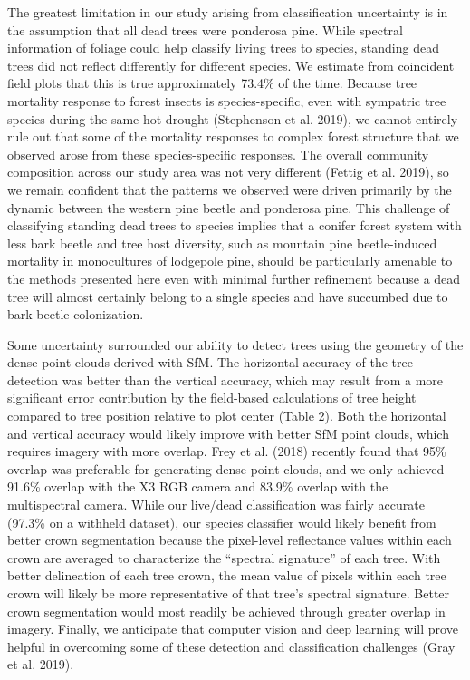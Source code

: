 \documentclass[]{article}
\begin{document}
The greatest limitation in our study arising from classification
uncertainty is in the assumption that all dead trees were ponderosa
pine. While spectral information of foliage could help classify living
trees to species, standing dead trees did not reflect differently for
different species. We estimate from coincident field plots that this is
true approximately 73.4\% of the time. Because tree mortality response
to forest insects is species-specific, even with sympatric tree species
during the same hot drought (Stephenson et al. 2019), we cannot entirely
rule out that some of the mortality responses to complex forest
structure that we observed arose from these species-specific responses.
The overall community composition across our study area was not very
different (Fettig et al. 2019), so we remain confident that the patterns
we observed were driven primarily by the dynamic between the western
pine beetle and ponderosa pine. This challenge of classifying standing
dead trees to species implies that a conifer forest system with less
bark beetle and tree host diversity, such as mountain pine
beetle-induced mortality in monocultures of lodgepole pine, should be
particularly amenable to the methods presented here even with minimal
further refinement because a dead tree will almost certainly belong to a
single species and have succumbed due to bark beetle colonization.

Some uncertainty surrounded our ability to detect trees using the
geometry of the dense point clouds derived with SfM. The horizontal
accuracy of the tree detection was better than the vertical accuracy,
which may result from a more significant error contribution by the
field-based calculations of tree height compared to tree position
relative to plot center (Table 2). Both the horizontal and vertical
accuracy would likely improve with better SfM point clouds, which
requires imagery with more overlap. Frey et al. (2018) recently found
that 95\% overlap was preferable for generating dense point clouds, and
we only achieved 91.6\% overlap with the X3 RGB camera and 83.9\%
overlap with the multispectral camera. While our live/dead
classification was fairly accurate (97.3\% on a withheld dataset), our
species classifier would likely benefit from better crown segmentation
because the pixel-level reflectance values within each crown are
averaged to characterize the ``spectral signature'' of each tree. With
better delineation of each tree crown, the mean value of pixels within
each tree crown will likely be more representative of that tree's
spectral signature. Better crown segmentation would most readily be
achieved through greater overlap in imagery. Finally, we anticipate that
computer vision and deep learning will prove helpful in overcoming some
of these detection and classification challenges (Gray et al. 2019).
\end{document}
